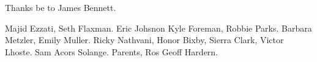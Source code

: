 Thanks be to James Bennett.

Majid Ezzati, Seth Flaxman.
Eric Johsnon
Kyle Foreman, Robbie Parks.
Barbara Metzler, Emily Muller.
Ricky Nathvani, Honor Bixby, Sierra Clark, Victor Lhoste.
Sam Acors
Solange.
Parents, Ros
Geoff Hardern.

